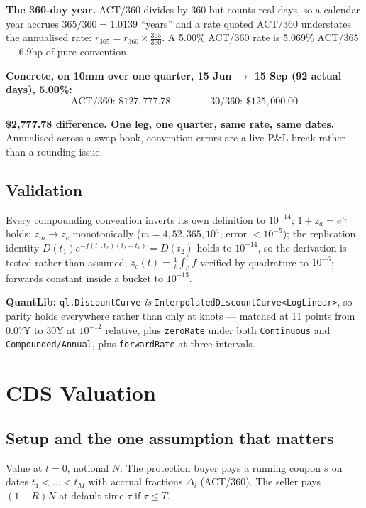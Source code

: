 \documentclass[11pt,a4paper]{article}
\newcommand{\keypoint}[1]{%
  \par\vspace{0.4em}\noindent
  \colorbox{codebg}{\parbox{\dimexpr\linewidth-2\fboxsep}{\small #1}}%
  \par\vspace{0.5em}}
\begin{document}
\textbf{The 360-day year.} ACT/360 divides by 360 but counts real days, so a calendar year
accrues $365/360 = 1.0139$ ``years'' and a rate quoted ACT/360 understates the annualised
rate: $r_{365} = r_{360}\times\frac{365}{360}$. A 5.00\% ACT/360 rate is 5.069\% ACT/365 ---
6.9bp of pure convention.

\textbf{Concrete, on 10mm over one quarter, 15 Jun $\to$ 15 Sep (92 actual days), 5.00\%:}
\[
\text{ACT/360: } \$127{,}777.78
\qquad\qquad
\text{30/360: } \$125{,}000.00
\]

\keypoint{\textbf{\$2,777.78 difference. One leg, one quarter, same rate, same dates.}
Annualised across a swap book, convention errors are a live P\&L break rather than a
rounding issue.}

\subsection{Validation}

Every compounding convention inverts its own definition to $10^{-14}$; $1+z_a = e^{z_c}$
holds; $z_m \to z_c$ monotonically ($m = 4, 52, 365, 10^4$; error $< 10^{-5}$); the
replication identity $D(t_1)e^{-f(t_1,t_2)(t_2-t_1)} = D(t_2)$ holds to $10^{-14}$, so the
derivation is tested rather than assumed; $z_c(t) = \frac1t\int_0^t f$ verified by quadrature
to $10^{-6}$; forwards constant inside a bucket to $10^{-13}$.

\textbf{QuantLib:} \texttt{ql.DiscountCurve} \emph{is} \texttt{InterpolatedDiscountCurve<LogLinear>},
so parity holds everywhere rather than only at knots --- matched at 11 points from 0.07Y to
30Y at $10^{-12}$ relative, plus \texttt{zeroRate} under both \texttt{Continuous} and
\texttt{Compounded/Annual}, plus \texttt{forwardRate} at three intervals.

\newpage
\section{CDS Valuation}

\subsection{Setup and the one assumption that matters}

Value at $t=0$, notional $N$. The protection buyer pays a running coupon $s$ on dates
$t_1 < \dots < t_M$ with accrual fractions $\Delta_i$ (ACT/360). The seller pays $(1-R)N$ at
default time $\tau$ if $\tau \le T$.
\end{document}
